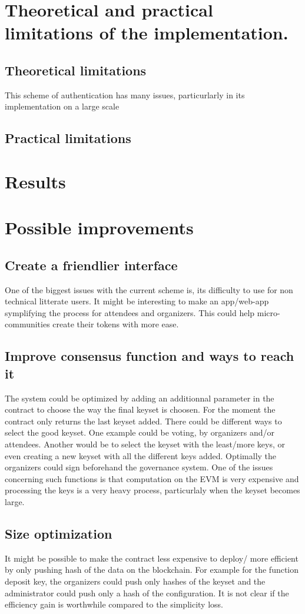 \documentclass[11pt, a4paper, twoside, openright]{book} %
\begin{document}
\section{Theoretical and practical limitations of the implementation.}
\subsection{Theoretical limitations}
This scheme of authentication has many issues, particurlarly in its implementation on a large scale
\subsection{Practical limitations}
\section{Results}
\section{Possible improvements}

\subsection{Create a friendlier interface}
One of the biggest issues with the current scheme is, its difficulty to use for non technical litterate users. It might be interesting to make an app/web-app symplifying the process for attendees and organizers. This could help micro-communities create their tokens with more ease.
\subsection{Improve consensus function and ways to reach it}
The system could be optimized by adding an additionnal parameter in the contract to choose the way the final keyset is choosen. For the moment the contract only returns the last keyset added. There could be different ways to select the good keyset. One example could be voting, by organizers and/or attendees. Another would be to select the keyset with the least/more keys, or even creating a new keyset with all the different keys added. Optimally the organizers could sign beforehand the governance system. One of the issues concerning such functions is that computation on the EVM is very expensive and processing the keys is a very heavy process, particurlaly when the keyset becomes large. 

\subsection{Size optimization}
It might be possible to make the contract less expensive to deploy/ more efficient by only pushing hash of the data on the blockchain. For example for the function deposit key, the organizers could push only hashes of the keyset and the administrator could push only a hash of the configuration. It is not clear if the efficiency gain is worthwhile compared to the simplicity loss.
\end{document}
